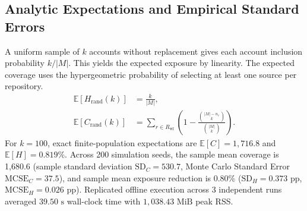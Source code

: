 \subsection{Analytic Expectations and Empirical Standard Errors}
A uniform sample of $k$ accounts without replacement gives each account inclusion probability $k/|M|$. This yields the expected exposure by linearity. The expected coverage uses the hypergeometric probability of selecting at least one source per repository.
\begin{align}
\mathbb{E}[H_{\text{rand}}(k)] &= \frac{k}{\lvert M\rvert}, \\
\mathbb{E}[C_{\text{rand}}(k)] &= \sum_{r \in R_{\text{wf}}}
  \left( 1 - \frac{\binom{\lvert M\rvert-n_r}{k}}
                  {\binom{\lvert M\rvert}{k}} \right).
\end{align}
For $k = 100$, exact finite-population expectations are $\mathbb{E}[C] = 1{,}716.8$ and $\mathbb{E}[H] = 0.819\%$. Across 200 simulation seeds, the sample mean coverage is 1,680.6 (sample standard deviation $\text{SD}_C = 530.7$, Monte Carlo Standard Error $\text{MCSE}_C = 37.5$), and sample mean exposure reduction is $0.80\%$ ($\text{SD}_H = 0.373\text{ pp}$, $\text{MCSE}_H = 0.026\text{ pp}$). Replicated offline execution across 3 independent runs averaged $39.50\text{ s}$ wall-clock time with $1{,}038.43\text{ MiB}$ peak RSS.
